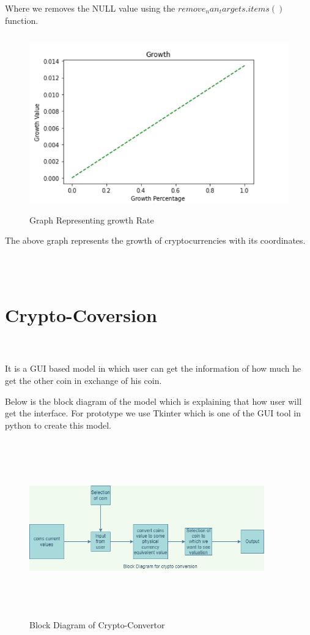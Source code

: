 \documentclass[openany,12pt]{report}
\begin{document}
{{{{{Where we removes the NULL value using the $remove_nan_targets.items()$ function.
\begin{figure}[H]
\centering
\includegraphics[width=5in,height=3in]{./growth.png}
\caption{Graph Representing growth Rate }
\end{figure}

 The above graph represents the growth of cryptocurrencies with its coordinates.

\\
\\
\clearpage
\section{Crypto-Coversion}\\
\\
It is a GUI based model in which user can get the information of how much he get the other coin in exchange of his coin.

Below is the block diagram of the model which is explaining that how user will get the interface.
For prototype we use Tkinter which is one of the GUI tool in python to create this model.
\\
\begin{figure}[H]
\centering
\includegraphics[width=4in,height=3in]{./Cryptoconvertor.png}
\caption{Block Diagram of Crypto-Convertor }
\end{figure}
\\
}}}}}
\end{document}
